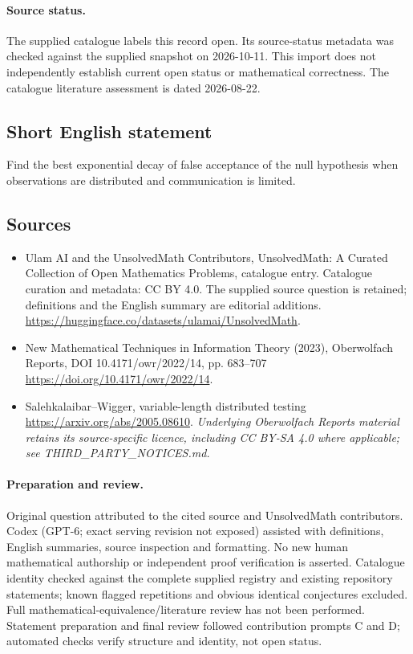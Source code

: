 \documentclass[11pt]{article}
\begin{document}
\paragraph{Source status.}
The supplied catalogue labels this record open. Its source-status metadata was checked against the supplied snapshot on 2026-10-11. This import does not independently establish current open status or mathematical correctness. The catalogue literature assessment is dated 2026-08-22.
\subsection{Short English statement}
Find the best exponential decay of false acceptance of the null hypothesis when observations are distributed and communication is limited.
\subsection{Sources}
\begin{itemize}
\item[S1] Ulam AI and the UnsolvedMath Contributors, UnsolvedMath: A Curated Collection of Open Mathematics Problems, catalogue entry. Catalogue curation and metadata: CC BY 4.0. The supplied source question is retained; definitions and the English summary are editorial additions.
\url{https://huggingface.co/datasets/ulamai/UnsolvedMath}.
\item[S2] New Mathematical Techniques in Information Theory (2023), Oberwolfach Reports, DOI 10.4171/owr/2022/14, pp. 683--707
\url{https://doi.org/10.4171/owr/2022/14}.
\item[S3] Salehkalaibar--Wigger, variable-length distributed testing
\url{https://arxiv.org/abs/2005.08610}.
\textit{Underlying Oberwolfach Reports material retains its source-specific licence, including CC BY-SA 4.0 where applicable; see THIRD\_PARTY\_NOTICES.md.}
\end{itemize}
\paragraph{Preparation and review.}
Original question attributed to the cited source and UnsolvedMath contributors. Codex (GPT-6; exact serving revision not exposed) assisted with definitions, English summaries, source inspection and formatting. No new human mathematical authorship or independent proof verification is asserted. Catalogue identity checked against the complete supplied registry and existing repository statements; known flagged repetitions and obvious identical conjectures excluded. Full mathematical-equivalence/literature review has not been performed. Statement preparation and final review followed contribution prompts C and D; automated checks verify structure and identity, not open status.
\label{end:statement}
\end{document}
